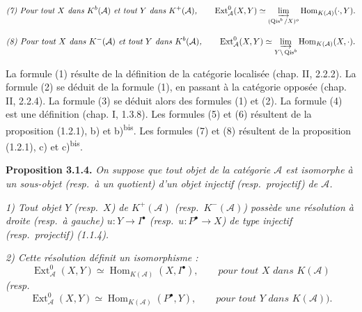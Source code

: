 \clearpage
{}%
\begingroup\small\setlength{\parskip}{0pt}\setlength{\emergencystretch}{1.5em}
\setlength{\abovedisplayskip}{4pt plus 2pt minus 2pt}%
\setlength{\belowdisplayskip}{4pt plus 2pt minus 2pt}%

\[
\textit{(7) Pour tout $X$ dans $K^{b}(\mathcal A)$ et tout $Y$ dans
$K^{+}(\mathcal A)$,}\qquad
\operatorname{Ext}_{\mathcal A}^{0}(X,Y)\simeq
\varinjlim_{(\operatorname{Qis}^{b}/X)^o}
\operatorname{Hom}_{K(\mathcal A)}(\mathord\cdot,Y).
\]

\[
\textit{(8) Pour tout $X$ dans $K^{-}(\mathcal A)$ et tout $Y$ dans
$K^{b}(\mathcal A)$,}\qquad
\operatorname{Ext}_{\mathcal A}^{0}(X,Y)\simeq
\varinjlim_{Y\backslash\operatorname{Qis}^{b}}
\operatorname{Hom}_{K(\mathcal A)}(X,\mathord\cdot).
\]

La formule (1) résulte de la définition de la catégorie localisée (chap. II,
2.2.2). La formule (2) se déduit de la formule (1), en passant à la catégorie
opposée (chap. II, 2.2.4). La formule (3) se déduit alors des formules (1) et
(2). La formule (4) est une définition (chap. I, 1.3.8). Les formules (5) et
(6) résultent de la proposition (1.2.1), b) et b)\textsuperscript{bis}. Les
formules (7) et (8) résultent de la proposition (1.2.1), c) et
c)\textsuperscript{bis}.

\medskip\noindent\textbf{Proposition 3.1.4.}\quad
\textit{On suppose que tout objet de la catégorie $\mathcal A$ est isomorphe
à un sous-objet (resp.\ à un quotient) d'un objet injectif (resp.\ projectif)
de $\mathcal A$.}

\noindent\textit{1) Tout objet $Y$ (resp.\ $X$) de $K^{+}(\mathcal A)$
(resp.\ $K^{-}(\mathcal A)$) possède une résolution à droite (resp.\ à gauche)
$u\colon Y\longrightarrow I^\bullet$ (resp.\
$u\colon P^\bullet\longrightarrow X$) de type injectif (resp.\ projectif)
(1.1.4).}

\noindent\textit{2) Cette résolution définit un isomorphisme :}
\[
\operatorname{Ext}_{\mathcal A}^{0}(X,Y)\simeq
\operatorname{Hom}_{K(\mathcal A)}(X,I^\bullet),
\qquad\textit{pour tout $X$ dans $K(\mathcal A)$}
\]
\noindent\textit{(resp.\ }
\[
\operatorname{Ext}_{\mathcal A}^{0}(X,Y)\simeq
\operatorname{Hom}_{K(\mathcal A)}(P^\bullet,Y),
\qquad\textit{pour tout $Y$ dans $K(\mathcal A)$).}
\]

